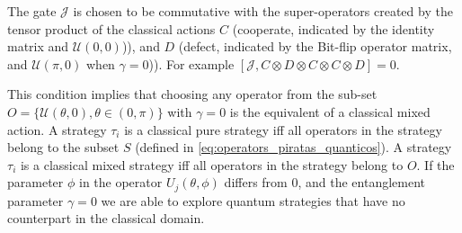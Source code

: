 The gate $\mathcal{J}$ is chosen to be commutative with the super-operators created by the tensor product of the classical actions $C$ (cooperate, indicated by the identity matrix and $\mathcal{U}(0,0)$)), and $D$ (defect, indicated by the Bit-flip operator matrix, and $\mathcal{U}(\pi,0)$ when $\gamma = 0$)). For example $[ \mathcal{J} , C \otimes D \otimes C \otimes C \otimes D ] = 0 $.


This condition implies that choosing any operator from the sub-set $O = \{ \mathcal{U} ( \theta , 0) , \theta \in (0, \pi) \}$ with $\gamma = 0$ is the equivalent of a classical mixed action. A strategy $\tau_{i}$ is a classical pure strategy iff all operators in the strategy belong to the subset $S$ (defined in \ref{eq:operators_piratas_quanticos}). A strategy $\tau_{i}$ is a classical mixed strategy iff all operators in the strategy belong to $O$.
If the parameter $\phi$ in the operator $U_{j}(\theta ,\phi)$ differs from $0$, and the entanglement parameter $\gamma = 0$ we are able to explore quantum strategies that have no counterpart in the classical domain\cite{Eisert2008}.










